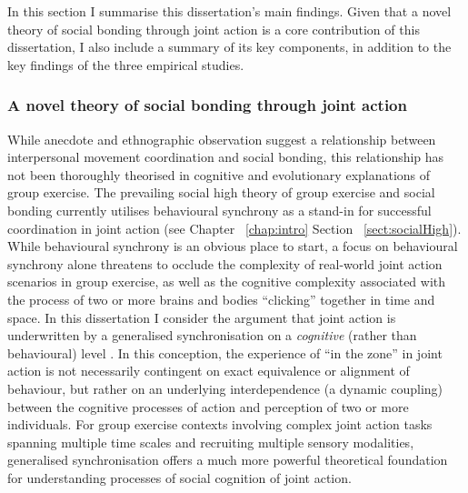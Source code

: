In this section I summarise this dissertation's main findings.  Given that a novel theory of social bonding through joint action is a core contribution of this dissertation, I also include a summary of its key components, in addition to the key findings of the three empirical studies.

\subsubsection{A novel theory of social bonding through joint action}
While anecdote and ethnographic observation suggest a relationship between interpersonal movement coordination and social bonding, this relationship has not been thoroughly theorised in cognitive and evolutionary explanations of group exercise.  The prevailing social high theory of group exercise and social bonding currently utilises behavioural synchrony as a stand-in for successful coordination in joint action (see Chapter ~\ref{chap:intro} Section ~\ref{sect:socialHigh}).  While behavioural synchrony is an obvious place to start, a focus on behavioural synchrony alone threatens to occlude the complexity of real-world joint action scenarios in group exercise, as well as the cognitive complexity associated with the process of two or more brains and bodies ``clicking'' together in time and space.  In this dissertation I consider the argument that joint action is underwritten by a generalised synchronisation on a \textit{cognitive} (rather than behavioural) level \citep[see Chapter ~\ref{chap:theory} Section ~\ref{sect:sect:activeInfJA};][]{Friston2015,Friston2015a,Kelso2013,Fusaroli2014}.  In this conception, the experience of ``in the zone'' in joint action is not necessarily contingent on exact equivalence or alignment of behaviour, but rather on an underlying interdependence (a dynamic coupling) between the cognitive processes of action and perception of two or more individuals.  For group exercise contexts involving complex joint action tasks spanning multiple time scales and recruiting multiple sensory modalities, generalised synchronisation offers a much more powerful theoretical foundation for understanding processes of social cognition of joint action.

